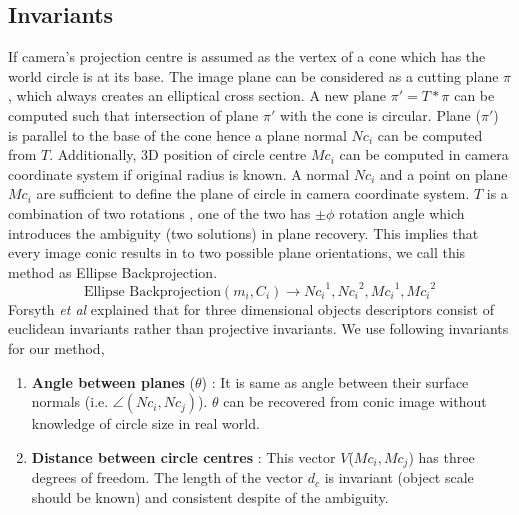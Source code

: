 \documentclass{bmvc2k}
\def\etal{\emph{et al}\bmvaOneDot}
\begin{document}
\subsection{Invariants}
If camera's projection centre is assumed as the vertex of a cone which has the world circle is at its base.
The image plane can be considered as a cutting plane $\pi$, which always creates an elliptical cross section.  
A new plane $ \pi' = T* \pi $ can be computed such that intersection of plane $\pi'$ with the cone is circular. 
Plane ($\pi'$) is parallel to the base of the cone hence a plane normal $Nc_i$ can be computed from $T$. 
Additionally, 3D position of circle centre $Mc_i$ can be computed in camera coordinate system if original radius is known.
A normal $Nc_i$ and a point on plane $Mc_i$ are sufficient to define the plane of circle in camera coordinate system.
$ T $ is a combination of two rotations \cite{forsyth_91}\cite{lo_pez_de_ipin_a_trip:_2002}, one of the two has $\pm \phi$ rotation angle which introduces the ambiguity (two solutions) in plane recovery. 
This implies that every image conic results in to two possible plane orientations, we call this method as Ellipse Backprojection. 
\begin{equation}
\text{Ellipse Backprojection}(m_i,C_i) \rightarrow {Nc_i}^1,{Nc_i}^2,{Mc_i}^1,{Mc_i}^2
\end{equation}
Forsyth \etal \cite{forsyth_91} explained that for three dimensional objects descriptors consist of euclidean invariants rather than projective invariants. We use following invariants for our method, 
\begin{enumerate}
	\item \textbf{Angle between planes} ($\theta$) : It is same as angle between their surface normals 
	(i.e. $ \angle(Nc_i,Nc_j) $). $\theta$ can be recovered from conic image without knowledge of circle size in real world.  
	\item \textbf{Distance between circle centres} : This vector $ V $($ Mc_i,Mc_j $) has three degrees of freedom. The length of the vector $d_c$ is invariant (object scale should be known) and consistent despite of the ambiguity. 
\end{enumerate}
\end{document}

